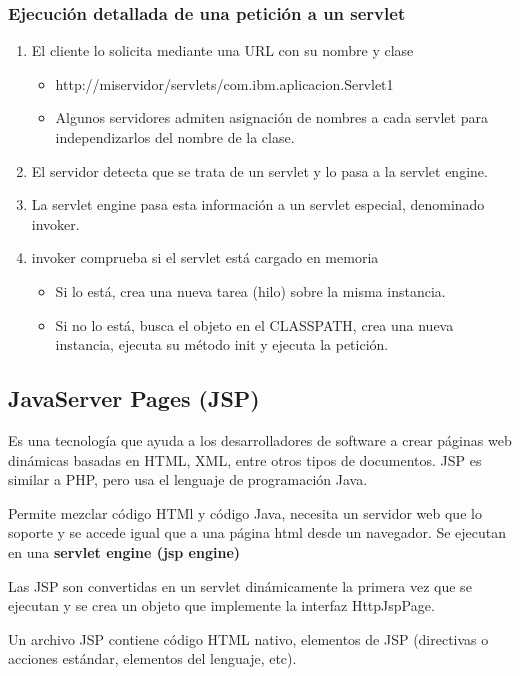 \documentclass{apuntes}
\begin{document}
\subsubsection{Ejecución detallada de una petición a un servlet}
\begin{enumerate}
\item El cliente lo solicita mediante una URL con su nombre y clase
\begin{itemize}
\item http://miservidor/servlets/com.ibm.aplicacion.Servlet1
\item Algunos servidores admiten asignación de nombres a cada servlet para independizarlos del nombre de la clase.
\end{itemize}
\item El servidor detecta que se trata de un servlet y lo pasa a la servlet engine.
\item La servlet engine pasa esta información a un servlet especial, denominado invoker.
\item invoker comprueba si el servlet está cargado en memoria
\begin{itemize}
\item Si lo está, crea una nueva tarea (hilo) sobre la misma instancia.
\item Si no lo está, busca el objeto en el CLASSPATH, crea una nueva instancia, ejecuta su método init y ejecuta la petición.
\end{itemize}
\end{enumerate}

\subsection{JavaServer Pages (JSP)}
\begin{defn}[JSP]
Es una tecnología que ayuda a los desarrolladores de software a crear páginas web dinámicas basadas en HTML, XML, entre otros tipos de documentos. JSP es similar a PHP, pero usa el lenguaje de programación Java.
\end{defn}

Permite mezclar código HTMl y código Java, necesita un servidor web que lo soporte y se accede igual que a una página html desde un navegador. Se ejecutan en una \textbf{servlet engine (jsp engine)}

Las JSP son convertidas en un servlet dinámicamente la primera vez que se ejecutan y se crea un objeto que implemente la interfaz HttpJspPage.

Un archivo JSP contiene código HTML nativo, elementos de JSP (directivas o acciones estándar, elementos del lenguaje, etc).
\end{document}
